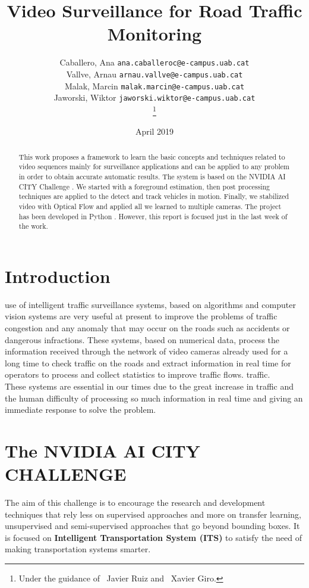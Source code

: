 \documentclass[journal, a4paper]{IEEEtran}
\title{Video Surveillance for Road Traffic Monitoring}
\author{
  Caballero, Ana 
  \texttt{ana.caballeroc@e-campus.uab.cat}
  \\[1ex]
  Vallve, Arnau 
  \texttt{arnau.vallve@e-campus.uab.cat}
  \\[1ex]
  Malak, Marcin 
  \texttt{malak.marcin@e-campus.uab.cat}
  \\[1ex]
  Jaworski, Wiktor 
  \texttt{jaworski.wiktor@e-campus.uab.cat}
  
  \thanks{Under the guidance of  ~Javier Ruiz and ~Xavier Giro.}
}
\date{April 2019}
\begin{document}
\maketitle


\begin{abstract}

This work proposes a framework to learn  the basic concepts and techniques related to video sequences mainly for surveillance applications and can be applied to any problem in order to obtain accurate automatic results. The system is based on the NVIDIA AI CITY Challenge \cite{Nvidia}. We started with a foreground estimation, then post processing techniques are applied to the detect and track vehicles in motion. Finally, we stabilized video with Optical Flow and applied all we learned to multiple cameras. The project has been developed in Python \cite{GitRepo}. However, this report is focused just in the last week of the work.

\end{abstract}

\section{Introduction}
\label{sec:Introduction}
 use of intelligent traffic surveillance systems, based on algorithms and computer vision systems are very useful at present to improve the problems of traffic congestion and any anomaly that may occur on the roads such as accidents or dangerous infractions. These systems, based on numerical data, process the information received through the network of video cameras already used for a long time to check traffic on the roads and extract information in real time for operators to process and collect statistics to improve traffic flows. traffic.\\
 
These systems are essential in our times due to the great increase in traffic and the human difficulty of processing so much information in real time and giving an immediate response to solve the problem.

\section{The NVIDIA AI CITY CHALLENGE}
\label{sec:NVidia}
The aim of this challenge is to encourage the research and development techniques that rely less on supervised approaches and more on transfer learning, unsupervised and semi-supervised approaches that go beyond bounding boxes.  It is focused on \textbf{Intelligent Transportation System (ITS)} to  satisfy the need of  making transportation systems smarter. \\
\end{document}
